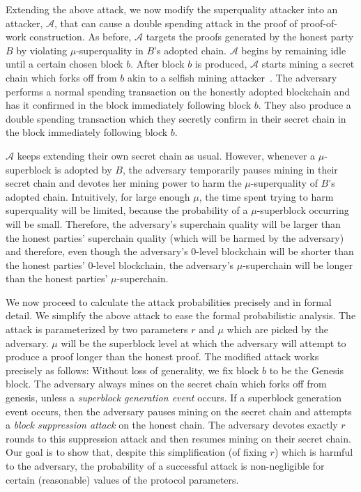 Extending the above attack, we now modify the superquality attacker into an
attacker, $\mathcal{A}$, that can cause a double spending attack in the proof of
proof-of-work construction. As before, $\mathcal{A}$ targets the proofs
generated by the honest party $B$ by violating $\mu$-superquality in $B$'s
adopted chain. $\mathcal{A}$ begins by remaining idle until a certain chosen
block $b$. After block $b$ is produced, $\mathcal{A}$ starts mining a secret
chain which forks off from $b$ akin to a selfish mining attacker~\cite{selfish}.
The adversary performs a normal spending transaction on the honestly adopted
blockchain and has it confirmed in the block immediately following block $b$.
They also produce a double spending transaction which they secretly confirm in
their secret chain in the block immediately following block $b$.

$\mathcal{A}$ keeps extending their own secret chain as usual. However, whenever
a $\mu$-superblock is adopted by $B$, the adversary temporarily pauses mining in
their secret chain and devotes her mining power to harm the $\mu$-superquality
of $B$'s adopted chain. Intuitively, for large enough $\mu$, the time spent
trying to harm superquality will be limited, because the probability of a
$\mu$-superblock occurring will be small. Therefore, the adversary's superchain
quality will be larger than the honest parties' superchain quality (which will
be harmed by the adversary) and therefore, even though the adversary's
0-level blockchain will be shorter than the honest parties' 0-level blockchain,
the adversary's $\mu$-superchain will be longer than the honest parties'
$\mu$-superchain.

We now proceed to calculate the attack probabilities precisely and in formal
detail. We simplify the above attack to ease the formal probabilistic analysis.
The attack is parameterized by two parameters $r$ and $\mu$ which are picked by
the adversary. $\mu$ will be the superblock level at which the adversary will
attempt to produce a proof longer than the honest proof. The modified attack
works precisely as follows: Without loss of generality, we fix block $b$ to be
the Genesis block. The adversary always mines on the secret chain which forks
off from genesis, unless a \textit{superblock generation event} occurs. If a
superblock generation event occurs, then the adversary pauses mining on the
secret chain and attempts a \textit{block suppression attack} on the honest
chain. The adversary devotes exactly $r$ rounds to this suppression attack and
then resumes mining on their secret chain. Our goal is to show that, despite
this simplification (of fixing $r$) which is harmful to the adversary, the
probability of a successful attack is non-negligible for certain (reasonable)
values of the protocol parameters.

